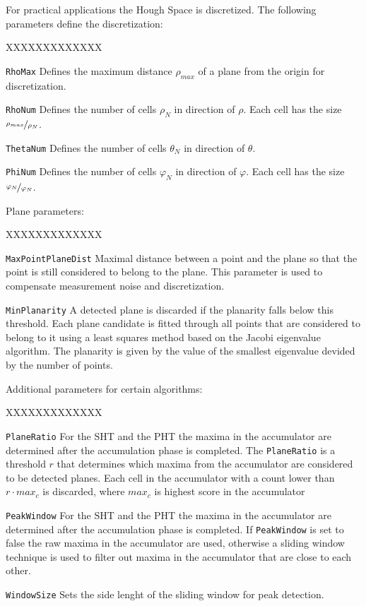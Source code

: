 \documentclass{InsightArticle}
\newcommand{\X}{XXXXXXXXXXXXX}
\begin{document}
For practical applications the Hough Space is discretized. The following
parameters define the discretization:

\begin{liste}{\X}
\item[\texttt{RhoMax}] Defines the maximum distance $\rho_{max}$ of a plane from the origin for
discretization.
\item[\texttt{RhoNum}] Defines the number of cells $\rho_{N}$ in direction of $\rho$. Each cell
has the size $\nicefrac{\rho_{max}}{\rho_{N}}$.
\item[\texttt{ThetaNum}] Defines the number of cells $\theta_{N}$ in direction of $\theta$.
\item[\texttt{PhiNum}] Defines the number of cells $\varphi_{N}$ in direction of $\varphi$. Each
cell has the size $\nicefrac{\varphi_{N}}{\varphi_{N}}$. 
\end{liste}

Plane parameters:

\begin{liste}{\X}
\item[\texttt{MaxPointPlaneDist}] Maximal distance between a point and the
plane so that the point is still considered to belong to the plane. This
parameter is used to compensate measurement noise and discretization.
\item[\texttt{MinPlanarity}] A detected plane is discarded if the planarity
falls below this threshold. Each plane candidate is fitted through all points
that are considered to belong to it using a least squares method based on the
Jacobi eigenvalue algorithm. The planarity is given by the value of the smallest
eigenvalue devided by the number of points.
\end{liste}

Additional parameters for certain algorithms:

\begin{liste}{\X}
\item[\texttt{PlaneRatio}] For the SHT and the PHT the maxima in the
accumulator are determined after the accumulation phase is completed. The
\texttt{PlaneRatio} is a threshold $r$ that determines which maxima from the
accumulator are considered to be detected planes. Each cell in the accumulator
with a count lower than $r\cdot max_c$ is discarded, where $max_c$ is highest score
in the accumulator
\item[\texttt{PeakWindow}] For the SHT and the PHT the maxima in the
accumulator are determined after the accumulation phase is completed. If
\texttt{PeakWindow} is set to false the raw maxima in the accumulator are used,
otherwise a sliding window technique is used to filter out maxima in the
accumulator that are close to each other.
\item[\texttt{WindowSize}] Sets the side lenght of the sliding window for
peak detection.
\end{liste}
\end{document}

